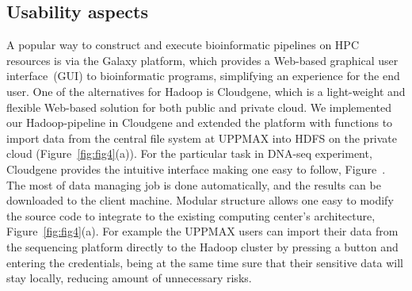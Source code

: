 \documentclass[11pt, oneside]{article}   	%
\begin{document}
\subsection{Usability aspects}
\label{subsectionIV_2}

A popular way to construct and execute bioinformatic pipelines on HPC resources is via the Galaxy\cite{galaxy} platform, which provides a Web-based graphical user interface~(GUI) to bioinformatic programs, simplifying an experience for the end user. 
One of the alternatives for Hadoop is Cloudgene\cite{cloudgene}, which is a light-weight and flexible Web-based solution for both public and private cloud. We implemented our Hadoop-pipeline in Cloudgene and extended the platform with functions to import data from the central file system at UPPMAX into HDFS on the private cloud (Figure~\ref{fig:fig4}(a)).
For the particular task in DNA-seq experiment, Cloudgene provides the intuitive interface making one easy to follow, Figure~. The most of data managing job is done automatically, and the results can be downloaded to the client machine. Modular structure allows one easy to modify the source code to integrate to the existing computing center’s architecture, Figure~\ref{fig:fig4}(a). For example the UPPMAX users can import their data from the sequencing platform directly to the Hadoop cluster by pressing a button and entering the credentials, being at the same time sure that their sensitive data will stay locally, reducing amount of unnecessary risks.
\end{document}
